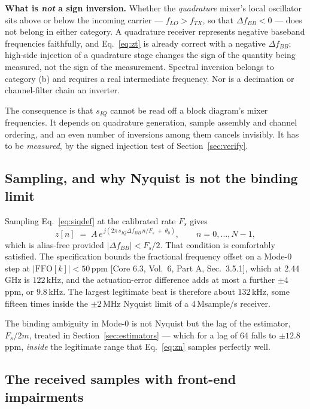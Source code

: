 \documentclass[11pt,a4paper]{article}
\newcommand{\FFO}{\mathrm{FFO}}
\newcommand{\core}[1]{\textcolor{rulegrey}{\small[Core 6.3, #1]}}
\begin{document}
\begin{caution}
\textbf{What is \emph{not} a sign inversion.} Whether the \emph{quadrature} mixer's local oscillator
sits above or below the incoming carrier --- $f_{LO} > f_{TX}$, so that $\Delta f_{BB} < 0$ --- does
not belong in either category. A quadrature receiver represents negative baseband frequencies
faithfully, and Eq.~\eqref{eq:zt} is already correct with a negative $\Delta f_{BB}$; high-side
injection of a quadrature stage changes the sign of the quantity being measured, not the sign of the
measurement. Spectral inversion belongs to category (b) and requires a real intermediate frequency.
Nor is a decimation or channel-filter chain an inverter.

The consequence is that $s_{IQ}$ cannot be read off a block diagram's mixer frequencies. It depends
on quadrature generation, sample assembly and channel ordering, and an even number of inversions
among them cancels invisibly. It has to be \emph{measured}, by the signed injection test of
Section~\ref{sec:verify}.
\end{caution}

\subsection{Sampling, and why Nyquist is not the binding limit}

Sampling Eq.~\eqref{eq:siqdef} at the calibrated rate $F_s$ gives
\begin{equation}
z[n] \;=\; A\,e^{\,j\left(2\pi\, s_{IQ}\Delta f_{BB}\, n/F_s \;+\; \theta_0\right)},
\qquad n = 0,\dots,N-1,
\label{eq:zn}
\end{equation}
which is alias-free provided $|\Delta f_{BB}| < F_s/2$. That condition is comfortably satisfied. The
specification bounds the fractional frequency offset on a Mode-0 step at $|\FFO[k]| < 50$\,ppm
\core{Vol.\ 6, Part A, Sec.\ 3.5.1}, which at 2.44\,GHz is $122$\,kHz, and the actuation-error
difference adds at most a further $\pm4$\,ppm, or $9.8$\,kHz. The largest legitimate beat is therefore
about $132$\,kHz, some fifteen times inside the $\pm2$\,MHz Nyquist limit of a $4$\,Msample/s
receiver.

The binding ambiguity in Mode-0 is not Nyquist but the lag of the estimator, $F_s/2m$, treated in
Section~\ref{sec:estimators} --- which for a lag of 64 falls to $\pm12.8$\,ppm, \emph{inside} the
legitimate range that Eq.~\eqref{eq:zn} samples perfectly well.

\subsection{The received samples with front-end impairments}
\end{document}
